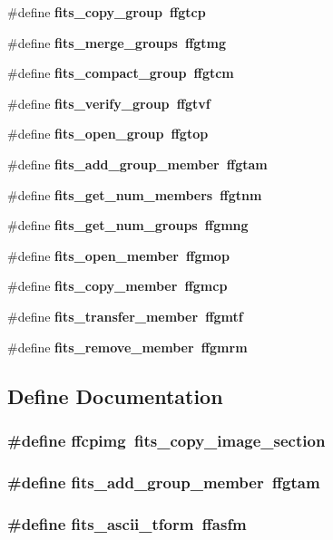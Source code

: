 \begin{CompactItemize}
\#define \bf{fits\_\-copy\_\-group}~ffgtcp
\item 
\#define \bf{fits\_\-merge\_\-groups}~ffgtmg
\item 
\#define \bf{fits\_\-compact\_\-group}~ffgtcm
\item 
\#define \bf{fits\_\-verify\_\-group}~ffgtvf
\item 
\#define \bf{fits\_\-open\_\-group}~ffgtop
\item 
\#define \bf{fits\_\-add\_\-group\_\-member}~ffgtam
\item 
\#define \bf{fits\_\-get\_\-num\_\-members}~ffgtnm
\item 
\#define \bf{fits\_\-get\_\-num\_\-groups}~ffgmng
\item 
\#define \bf{fits\_\-open\_\-member}~ffgmop
\item 
\#define \bf{fits\_\-copy\_\-member}~ffgmcp
\item 
\#define \bf{fits\_\-transfer\_\-member}~ffgmtf
\item 
\#define \bf{fits\_\-remove\_\-member}~ffgmrm
\end{CompactItemize}


\subsection{Define Documentation}
\subsubsection{\setlength{\rightskip}{0pt plus 5cm}\#define ffcpimg~fits\_\-copy\_\-image\_\-section}\label{src_2longnam_8h_421f404476b1124203a4959cfe5ffa55}


\subsubsection{\setlength{\rightskip}{0pt plus 5cm}\#define fits\_\-add\_\-group\_\-member~ffgtam}\label{src_2longnam_8h_77e070fc3e3583484c9ad06028fd414d}


\subsubsection{\setlength{\rightskip}{0pt plus 5cm}\#define fits\_\-ascii\_\-tform~ffasfm}\label{src_2longnam_8h_f4be92fa4ee55a50a9e8d554eee09bf6}


